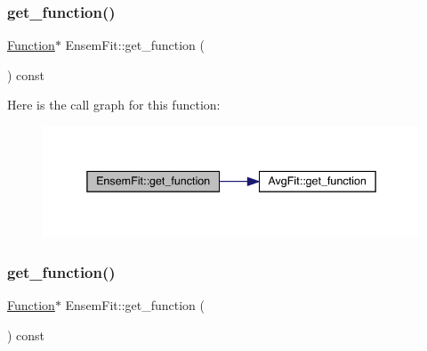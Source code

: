 \mbox{\label{classEnsemFit_a0731f0c71cd1b0b6c9d26ebff9cc3620}} 
\subsubsection{\texorpdfstring{get\_function()}{get\_function()}\hspace{0.1cm}{\footnotesize\ttfamily [1/2]}}
{\footnotesize\ttfamily \mbox{\hyperlink{classFunction}{Function}}$\ast$ Ensem\+Fit\+::get\+\_\+function (\begin{DoxyParamCaption}{ }\end{DoxyParamCaption}) const\hspace{0.3cm}{\ttfamily [inline]}}

Here is the call graph for this function\+:
\nopagebreak
\begin{figure}[H]
\begin{center}
\leavevmode
\includegraphics[width=338pt]{dc/dae/classEnsemFit_a0731f0c71cd1b0b6c9d26ebff9cc3620_cgraph}
\end{center}
\end{figure}
\mbox{\label{classEnsemFit_a0731f0c71cd1b0b6c9d26ebff9cc3620}} 
\subsubsection{\texorpdfstring{get\_function()}{get\_function()}\hspace{0.1cm}{\footnotesize\ttfamily [2/2]}}
{\footnotesize\ttfamily \mbox{\hyperlink{classFunction}{Function}}$\ast$ Ensem\+Fit\+::get\+\_\+function (\begin{DoxyParamCaption}{ }\end{DoxyParamCaption}) const\hspace{0.3cm}{\ttfamily [inline]}}

